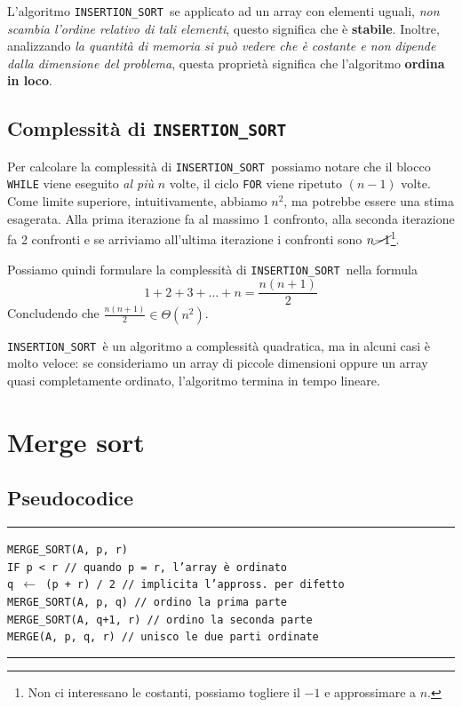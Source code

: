 \documentclass[a4paper,12pt,twoside]{report}
\newcommand\pseudo[1]{\setlength\parindent{0pt}\texttt{#1}\setlength\parindent{24pt} \\}
\newcommand\hlin{\noindent\rule[0.5ex]{\linewidth}{1pt}}
\newcommand\take[2]{#1 $\leftarrow$ #2}
\newcommand\insort{\texttt{INSERTION\_SORT }}
\begin{document}
L'algoritmo \insort se applicato ad un array con elementi uguali, \emph{non scambia l'ordine relativo di tali elementi}, questo significa che \`{e} \textbf{stabile}. Inoltre, analizzando \emph{la quantit\`{a} di memoria si pu\`{o} vedere che \`{e} costante e non dipende dalla dimensione del problema}, questa propriet\`{a} significa che l'algoritmo \textbf{ordina in loco}.

\subsection{Complessit\`{a} di \insort}

Per calcolare la complessit\`{a} di \insort possiamo notare che il blocco \texttt{WHILE} viene eseguito \emph{al pi\`{u}} $n$ volte, il ciclo \texttt{FOR} viene ripetuto $(n-1)$ volte. Come limite superiore, intuitivamente, abbiamo $n^2$, ma potrebbe essere una stima esagerata. Alla prima iterazione fa al massimo 1 confronto, alla seconda iterazione fa 2 confronti e se arriviamo all'ultima iterazione i confronti sono $n\cancel{-1}$\footnote[1]{Non ci interessano le costanti, possiamo togliere il $-1$ e approssimare a $n$.}. 

Possiamo quindi formulare la complessit\`{a} di \insort nella formula
\[1 + 2 + 3 + \dots + n = \frac{n(n+1)}{2} \]
Concludendo che $\frac{n(n+1)}{2} \in \Theta(n^2)$.

\insort \`{e} un algoritmo a complessit\`{a} quadratica, ma in alcuni casi \`{e} molto veloce: se consideriamo un array di piccole dimensioni oppure un array quasi completamente ordinato, l'algoritmo termina in tempo lineare. 

\section{Merge sort}
\subsection{Pseudocodice}

\hlin

\pseudo{MERGE\_SORT(A, p, r)} 
\texttt{\indent IF p < r \indent // quando p = r, l'array \`{e} ordinato \\
\indent\indent \take{q}{(p + r) / 2} \indent // implicita l'appross. per difetto \\
\indent\indent MERGE\_SORT(A, p, q) \indent // ordino la prima parte \\
\indent\indent MERGE\_SORT(A, q+1, r) \indent // ordino la seconda parte \\
\indent\indent MERGE(A, p, q, r)	\indent // unisco le due parti ordinate \\
}
\hlin
\end{document}
